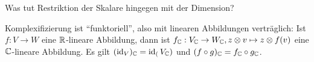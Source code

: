 \begin{sheet}
\begin{problem}[title={Komplexifizierung}]
\begin{subproblem}
Was tut Restriktion der Skalare hingegen mit der Dimension?
\end{subproblem}

\begin{subproblem}
Komplexifizierung ist \enquote{funktoriell}, also mit linearen Abbildungen verträglich: Ist $f:V\to W$ eine $\mathbb{R}$-lineare Abbildung, dann ist $f_{\mathbb{C}}: V_{\mathbb{C}}\to W_{\mathbb{C}}, z\otimes v \mapsto z\otimes f(v)$ eine $\mathbb{C}$-lineare Abbildung. Es gilt $(\operatorname{id}_V)_{\mathbb{C}}=\operatorname{id}_(V_{\mathbb{C}})$ und $(f\circ g)_{\mathbb{C}}=f_{\mathbb{C}}\circ g_{\mathbb{C}}$.
\end{subproblem}
\end{problem}

\end{sheet}